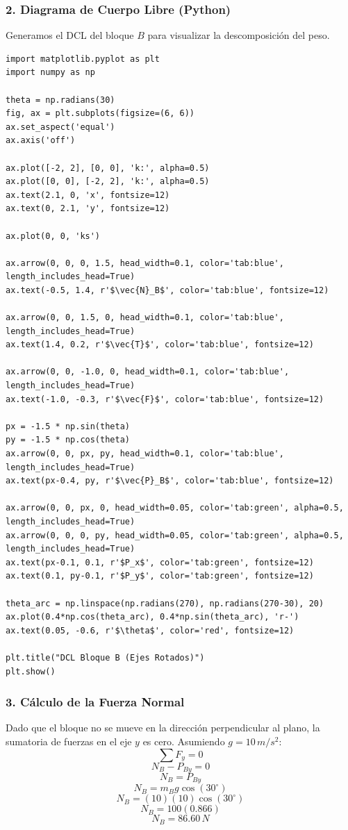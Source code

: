 \documentclass[12pt, a4paper]{article}
\begin{document}
\subsubsection*{2. Diagrama de Cuerpo Libre (Python)}
Generamos el DCL del bloque $B$ para visualizar la descomposición del peso.

\begin{lstlisting}
import matplotlib.pyplot as plt
import numpy as np

theta = np.radians(30)
fig, ax = plt.subplots(figsize=(6, 6))
ax.set_aspect('equal')
ax.axis('off')

ax.plot([-2, 2], [0, 0], 'k:', alpha=0.5)
ax.plot([0, 0], [-2, 2], 'k:', alpha=0.5)
ax.text(2.1, 0, 'x', fontsize=12)
ax.text(0, 2.1, 'y', fontsize=12)

ax.plot(0, 0, 'ks')

ax.arrow(0, 0, 0, 1.5, head_width=0.1, color='tab:blue', length_includes_head=True)
ax.text(-0.5, 1.4, r'$\vec{N}_B$', color='tab:blue', fontsize=12)

ax.arrow(0, 0, 1.5, 0, head_width=0.1, color='tab:blue', length_includes_head=True)
ax.text(1.4, 0.2, r'$\vec{T}$', color='tab:blue', fontsize=12)

ax.arrow(0, 0, -1.0, 0, head_width=0.1, color='tab:blue', length_includes_head=True)
ax.text(-1.0, -0.3, r'$\vec{F}$', color='tab:blue', fontsize=12)

px = -1.5 * np.sin(theta)
py = -1.5 * np.cos(theta)
ax.arrow(0, 0, px, py, head_width=0.1, color='tab:blue', length_includes_head=True)
ax.text(px-0.4, py, r'$\vec{P}_B$', color='tab:blue', fontsize=12)

ax.arrow(0, 0, px, 0, head_width=0.05, color='tab:green', alpha=0.5, length_includes_head=True)
ax.arrow(0, 0, 0, py, head_width=0.05, color='tab:green', alpha=0.5, length_includes_head=True)
ax.text(px-0.1, 0.1, r'$P_x$', color='tab:green', fontsize=12)
ax.text(0.1, py-0.1, r'$P_y$', color='tab:green', fontsize=12)

theta_arc = np.linspace(np.radians(270), np.radians(270-30), 20)
ax.plot(0.4*np.cos(theta_arc), 0.4*np.sin(theta_arc), 'r-')
ax.text(0.05, -0.6, r'$\theta$', color='red', fontsize=12)

plt.title("DCL Bloque B (Ejes Rotados)")
plt.show()
\end{lstlisting}

\subsubsection*{3. Cálculo de la Fuerza Normal}
Dado que el bloque no se mueve en la dirección perpendicular al plano, la sumatoria de fuerzas en el eje $y$ es cero. Asumiendo $g = 10 \, \si{m/s^2}$:
$$ \sum F_y = 0 $$
$$ N_B - P_{By} = 0 $$
$$ N_B = P_{By} $$
$$ N_B = m_B g \cos(30^\circ) $$
$$ N_B = (10)(10) \cos(30^\circ) $$
$$ N_B = 100 (0.866) $$
$$ N_B = 86.60 \, \si{N} $$
\end{document}

